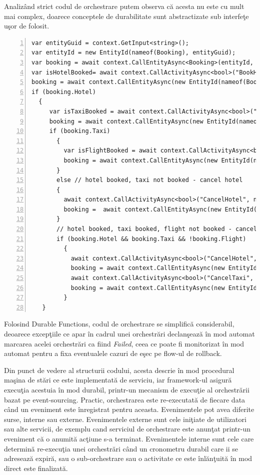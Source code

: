  \par Analizând strict codul de orchestrare putem observa că acesta nu este cu mult mai complex, doarece conceptele de durabilitate sunt abstractizate sub interfeţe uşor de folosit. 
\begin{lstlisting}[numbers=left]
var entityGuid = context.GetInput<string>();
var entityId = new EntityId(nameof(Booking), entityGuid);
var booking = await context.CallEntityAsync<Booking>(entityId, "Get");
var isHotelBooked= await context.CallActivityAsync<bool>("BookHotel", null);
booking = await context.CallEntityAsync(new EntityId(nameof(Booking), entityGuid),"UpdateHotel", isHotelBooked);
if (booking.Hotel)
  {
     var isTaxiBooked = await context.CallActivityAsync<bool>("BookTaxi", null);
     booking = await context.CallEntityAsync(new EntityId(nameof(Booking), entityGuid),"UpdateTaxi", isTaxiBooked);
     if (booking.Taxi)
       {
         var isFlightBooked = await context.CallActivityAsync<bool>("BookFlight", null);
         booking = await context.CallEntityAsync(new EntityId(nameof(Booking), entityGuid),"UpdateFlight", isFlightBooked);
       }
       else // hotel booked, taxi not booked - cancel hotel
       {
         await context.CallActivityAsync<bool>("CancelHotel", null);
         booking =  await context.CallEntityAsync(new EntityId(nameof(Booking), entityGuid),"UpdateHotel", false);
       }
       // hotel booked, taxi booked, flight not booked - cancel hotel & taxi
       if (booking.Hotel && booking.Taxi && !booking.Flight)
         {
           await context.CallActivityAsync<bool>("CancelHotel", null);
           booking = await context.CallEntityAsync(new EntityId(nameof(Booking), entityGuid),"UpdateHotel", false);
           await context.CallActivityAsync<bool>("CancelTaxi", null);
           booking = await context.CallEntityAsync(new EntityId(nameof(Booking), entityGuid),	"UpdateTaxi", false);
         }
   }
\end{lstlisting}
\par Folosind Durable Functions, codul de orchestrare se simplifică considerabil, deoarece excepţiile ce apar în cadrul unei orchestrări declanşează în mod automat marcarea acelei orchestrări ca fiind \emph{Failed}, ceea ce poate fi monitorizat în mod automat pentru a fixa eventualele cazuri de eşec pe flow-ul de rollback. 
\par Din punct de vedere al structurii codului, acesta descrie în mod procedural maşina de stări ce este implementată de serviciu, iar framework-ul asigură execuţia acestuia în mod durabil, printr-un mecanism de execuţie al orchestrării bazat pe event-sourcing. Practic, orchestrarea este re-executată de fiecare data când un eveniment este înregistrat pentru aceasta. Evenimentele pot avea diferite surse, interne sau externe. Evenimentele externe sunt cele iniţiate de utilizatori sau alte servicii, de exemplu cand serviciul de orchestrare este anunţat printr-un eveniment că o anumită acţiune s-a terminat. Evenimentele interne sunt cele care determină re-execuţia unei orchestrări când un cronometru durabil care ii se adresează expiră, sau o sub-orchestrare sau o activitate ce este înlănţuită în mod direct este finalizată. 
